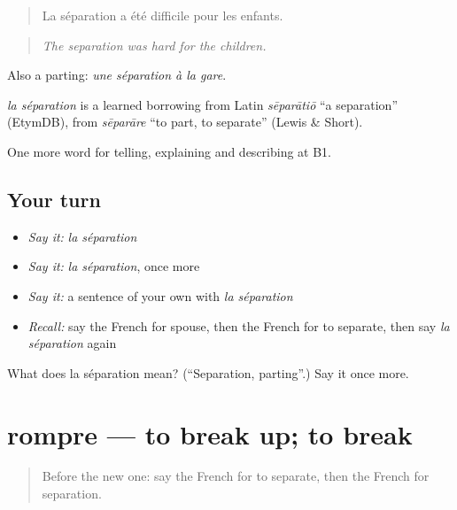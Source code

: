 \begin{quote}
La séparation a été difficile pour les enfants.
\end{quote}

\begin{quote}
\emph{The separation was hard for the children.}
\end{quote}

Also a parting: \emph{une séparation à la gare}.

\begin{cousinweb}
\emph{la séparation} is a learned borrowing from Latin \emph{sēparātiō} \textquotedblleft{}a separation\textquotedblright{} (EtymDB), from \emph{sēparāre} \textquotedblleft{}to part, to separate\textquotedblright{} (Lewis \& Short).
\end{cousinweb}

\begin{grammarlens}[title={What you've built}]
One more word for telling, explaining and describing at B1.
\end{grammarlens}

\subsection*{Your turn}
\begin{itemize}
\raggedright
  \item \emph{Say it:} \emph{la séparation}
  \item \emph{Say it:} \emph{la séparation}, once more
  \item \emph{Say it:} a sentence of your own with \emph{la séparation}
  \item \emph{Recall:} say the French for spouse, then the French for to separate, then say \emph{la séparation} again
\end{itemize}

\begin{tcolorbox}[breakable,colback=teal!4,colframe=teal!35!black,title={Before you move on}]
What does la séparation mean? (\textquotedblleft{}Separation, parting\textquotedblright{}.) Say it once more.
\end{tcolorbox}
\section[rompre]{rompre — to break up; to break}

\label{lesson:FR-C491-rompre}



\begin{quote}
Before the new one: say the French for to separate, then the French for separation.
\end{quote}

